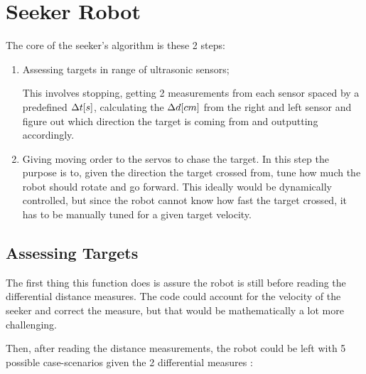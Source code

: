 \documentclass[sigconf,nonacm]{acmart}
\begin{document}
\section{Seeker Robot}

The core of the seeker's algorithm is these 2 steps:
\begin{enumerate}
      \item Assessing targets in range of ultrasonic sensors;
      
      This involves stopping, getting 2 measurements from each sensor spaced by
      a predefined $\Delta t\space[s]$, calculating the $\Delta d\space[cm]$ from the right and
      left sensor and figure out which direction the target is coming from and
      outputting accordingly.
      \item Giving moving order to the servos to chase the target. In this step the
      purpose is to, given the direction the target crossed from, tune how much
      the robot should rotate and go forward. This ideally would be dynamically
      controlled, but since the robot cannot know how fast the target crossed,
      it has to be manually tuned for a given target velocity.
\end{enumerate}

\subsection{Assessing Targets}

The first thing this function does is assure the robot is still before reading
the differential distance measures. The code could account for the velocity of
the seeker and correct the measure, but that would be mathematically a lot more
challenging.

Then, after reading the distance measurements, the robot could be left with 5
possible case-scenarios given the 2 differential measures :
\end{document}
